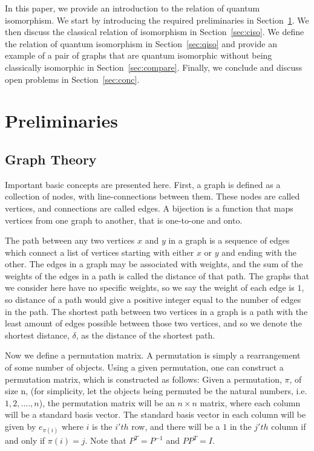\documentclass[12pt]{article}
\begin{document}
In this paper, we provide an introduction to the relation of quantum
isomorphism. We start by introducing the required preliminaries in
Section~\ref{sec:prelim}. We then discuss the classical relation of
isomorphism in Section~\ref{sec:ciso}. We define the relation of
quantum isomorphism in Section~\ref{sec:qiso} and provide an example
of a pair of graphs that are quantum isomorphic without being
classically isomorphic in Section~\ref{sec:compare}. Finally, we
conclude and discuss open problems in Section~\ref{sec:conc}.

\section{Preliminaries}
\label{sec:prelim}

\subsection{Graph Theory}
\label{ssec:graphtheory}

Important basic concepts are presented here. First, a graph is defined
as a collection of nodes, with line-connections between them. These
nodes are called vertices, and connections are called edges. A
bijection is a function that maps vertices from one graph to another,
that is one-to-one and onto.

The path between any two vertices $x$ and $y$ in a graph is a sequence
of edges which connect a list of vertices starting with either $x$ or
$y$ and ending with the other. The edges in a graph may be associated
with weights, and the sum of the weights of the edges in a path is
called the distance of that path. The graphs that we consider here
have no specific weights, so we say the weight of each edge is $1$, so
distance of a path would give a positive integer equal to the number
of edges in the path. The shortest path between two vertices in a
graph is a path with the least amount of edges possible between those
two vertices, and so we denote the shortest distance, $\delta$, as the
distance of the shortest path.

Now we define a permutation matrix. A permutation is simply a
rearrangement of some number of objects. Using a given permutation,
one can construct a permutation matrix, which is constructed as
follows: Given a permutation, $\pi$, of size n, (for simplicity, let
the objects being permuted be the natural numbers, i.e. $1, 2, ....,
n$), the permutation matrix will be an $n \times n$ matrix, where each
column will be a standard basis vector. The standard basis vector in
each column will be given by $e_{\pi(i)}$ where $i$ is the $i'th$ row,
and there will be a $1$ in the $j'th$ column if and only if $\pi(i) =
j$. Note that $P^T = P^{-1}$ and $PP^T = I$.
\end{document}
